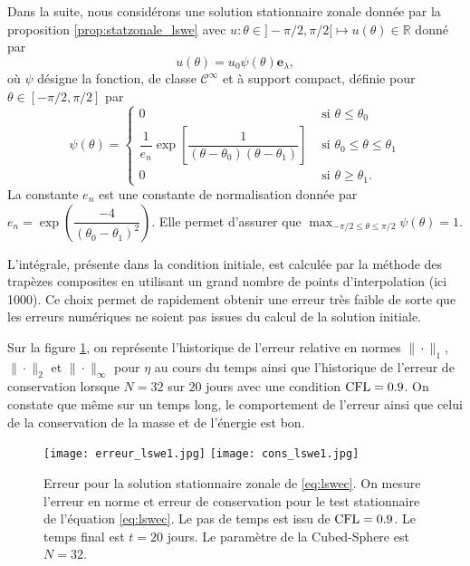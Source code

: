 Dans la suite, nous considérons une solution stationnaire zonale donnée par la proposition \ref{prop:statzonale_lswe} avec $u : \theta \in ]-\pi/2,\pi/2[ \mapsto u(\theta) \in \mathbb{R}$ donné par
\begin{equation}
u(\theta) = u_0 \psi(\theta) \mathbf{e}_{\lambda},
\end{equation}
où $\psi$ désigne la fonction, de classe $\mathcal{C}^{\infty}$ et à support compact, définie pour $\theta \in [-\pi/2, \pi/2]$ par
\begin{equation}
\psi(\theta) = \left\lbrace
\begin{array}{ll}
0 & \text{ si } \theta \leq \theta_0 \\
\dfrac{1}{e_n} \exp \left[ \dfrac{1}{(\theta-\theta_0)(\theta- \theta_1)} \right] & \text{ si } \theta_0 \leq \theta \leq \theta_1 \\
0 & \text{ si } \theta \geq \theta_1.
\end{array}
\right.
\label{eq:psi_supcompact}
\end{equation}
La constante $e_n$ est une constante de normalisation donnée par $e_n = \exp \left( \dfrac{-4}{(\theta_0 - \theta_1)^2} \right)$. Elle permet d'assurer que $\max_{- \pi/2 \leq \theta \leq \pi/2} \psi(\theta) = 1$.

L'intégrale, présente dans la condition initiale, est calculée par la méthode des trapèzes composites en utilisant un grand nombre de points d'interpolation (ici 1000). Ce choix permet de rapidement obtenir une erreur très faible de sorte que les erreurs numériques ne soient pas issues du calcul de la solution initiale.

Sur la figure \ref{fig:lswec_hist}, on représente l'historique de l'erreur relative en normes $\| \cdot \|_1$, $\| \cdot \|_2$ et $\| \cdot \|_{\infty}$ pour $\eta$ au cours du temps ainsi que l'historique de l'erreur de conservation lorsque $N=32$ sur $20$ jours avec une condition $\text{CFL} = 0.9$. On constate que même sur un temps long, le comportement de l'erreur ainsi que celui de la conservation de la masse et de l'énergie est bon.

\begin{figure}[htbp]
\begin{center}
\texttt{[image: erreur\_lswe1.jpg]}
\texttt{[image: cons\_lswe1.jpg]}
\end{center}
\caption{Erreur pour la solution stationnaire zonale de \eqref{eq:lswec}. On mesure l'erreur en norme et erreur de conservation pour le test stationnaire de l'équation \eqref{eq:lswec}. Le pas de temps est issu de $\text{CFL}=0.9$. Le temps final est $t=20$ jours. Le paramètre de la Cubed-Sphere est $N=32$.}
\label{fig:lswec_hist}
\end{figure}

